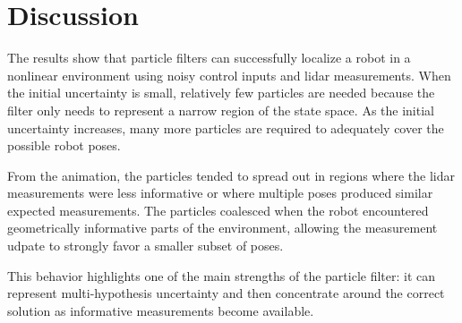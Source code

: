 \documentclass[11pt, letterpaper, twocolumn]{article}
\begin{document}
\section*{Discussion}

The results show that particle filters can successfully localize a robot in a 
nonlinear environment using noisy control inputs and lidar measurements. When
the initial uncertainty is small, relatively few particles are needed because
the filter only needs to represent a narrow region of the state space. As the
initial uncertainty increases, many more particles are required to adequately
cover the possible robot poses.

From the animation, the particles tended to spread out in regions where the 
lidar measurements were less informative or where multiple poses produced
similar expected measurements. The particles coalesced when the robot encountered
geometrically informative parts of the environment, allowing the measurement
udpate to strongly favor a smaller subset of poses.

This behavior highlights one of the main strengths of the particle filter: it
can represent multi-hypothesis uncertainty and then concentrate around the 
correct solution as informative measurements become available.
\end{document}
